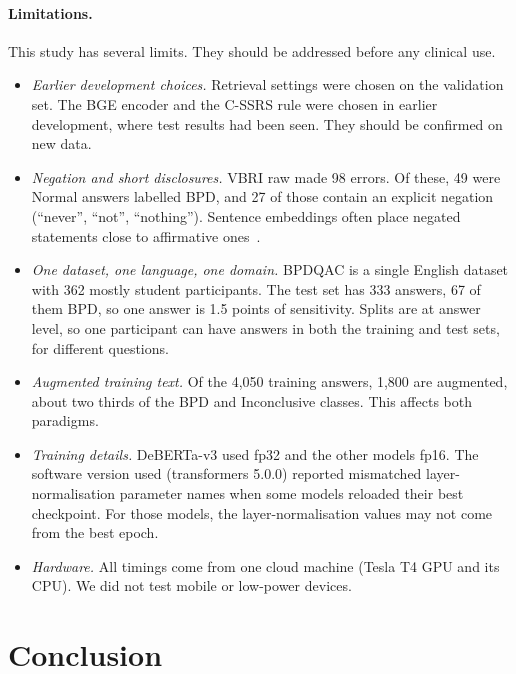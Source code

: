 \documentclass[11pt]{article}
\newcommand{\vbri}{VBRI}
\newcommand{\bpdqac}{BPDQAC}
\begin{document}
\paragraph{Limitations.}
This study has several limits. They should be addressed before any clinical use.
\begin{itemize}[leftmargin=*,itemsep=2pt]
  \item \emph{Earlier development choices.} Retrieval settings were chosen on the validation set. The
        BGE encoder and the C-SSRS rule were chosen in earlier development, where test results had
        been seen. They should be confirmed on new data.
  \item \emph{Negation and short disclosures.} \vbri{} raw made 98 errors. Of these, 49 were Normal
        answers labelled BPD, and 27 of those contain an explicit negation (``never'', ``not'',
        ``nothing''). Sentence embeddings often place negated statements close to affirmative
        ones~\cite{chiang2023heros,cao2025negation}.
  \item \emph{One dataset, one language, one domain.} \bpdqac{} is a single English dataset with 362
        mostly student participants. The test set has 333 answers, 67 of them BPD, so one answer is
        1.5 points of sensitivity. Splits are at answer level, so one participant can have answers in
        both the training and test sets, for different questions.
  \item \emph{Augmented training text.} Of the 4,050 training answers, 1,800 are augmented, about two
        thirds of the BPD and Inconclusive classes. This affects both paradigms.
  \item \emph{Training details.} DeBERTa-v3 used fp32 and the other models fp16. The software version
        used (transformers 5.0.0) reported mismatched layer-normalisation parameter names when some
        models reloaded their best checkpoint. For those models, the layer-normalisation values may
        not come from the best epoch.
  \item \emph{Hardware.} All timings come from one cloud machine (Tesla T4 GPU and its CPU). We did
        not test mobile or low-power devices.
\end{itemize}

\section{Conclusion}\label{sec:conclusion}
\end{document}
